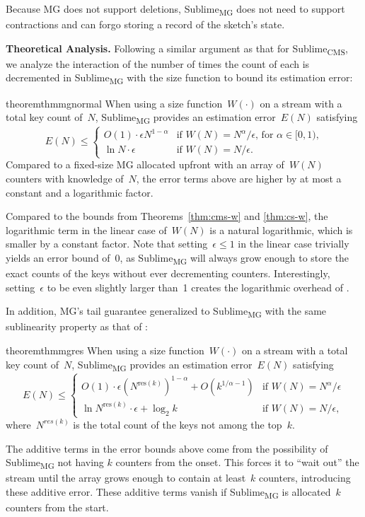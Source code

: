 \documentclass[sigconf]{acmart}
\newcommand{\sketch}{Sublime}
\newcommand{\sketchcms}{\sketch\textsubscript{CMS}\xspace}
\newcommand{\sketchmg}{\sketch\textsubscript{MG}\xspace}
\newcommand{\parentheses}[1]{\left(#1\right)}
\begin{document}
Because MG does not support deletions, \sketchmg does not need to support
contractions and can forgo storing a record of the sketch's state.

\textbf{Theoretical Analysis.} 
Following a similar argument as that for \sketchcms, we analyze the interaction
of the number of times the count of each is decremented in \sketchmg with the
size function to bound its estimation error:
\begin{restatable}{theorem}{thmmgnormal}
    \label{thm:mg-normal}
    When using a size function~$W(\cdot)$ on a stream with a total key count
    of~$N$, \sketchmg provides an estimation error~$E(N)$ satisfying
    $$
    E(N) \leq  
    \begin{cases}
        O(1) \cdot \epsilon N^{1-\alpha} & \text{if $W(N)=N^{\alpha}/\epsilon$, for $\alpha \in [0,1)$,} \\
        \ln N \cdot \epsilon & \text{if $W(N)=N/\epsilon$.}
    \end{cases}
    $$
    Compared to a fixed-size MG allocated upfront with an array of~$W(N)$
    counters with knowledge of~$N$, the error terms above are higher by at most
    a constant and a logarithmic factor.
\end{restatable}
Compared to the bounds from Theorems~\ref{thm:cms-w} and \ref{thm:cs-w}, the
logarithmic term in the linear case of~$W(N)$ is a natural logarithmic, which
is smaller by a constant factor. Note that setting~$\epsilon \leq 1$ in the
linear case trivially yields an error bound of~0, as \sketchmg will always grow
enough to store the exact counts of the keys without ever decrementing
counters. Interestingly, setting~$\epsilon$ to be even slightly larger than~1
creates the logarithmic overhead of .

In addition, MG's tail guarantee generalized to \sketchmg with the same
sublinearity property as that of :
\begin{restatable}{theorem}{thmmgres}
    \label{thm:mg-res}
    When using a size function~$W(\cdot)$ on a stream with a total key count
    of~$N$, \sketchmg provides an estimation error~$E(N)$ satisfying
    $$
    E(N) \leq  
    \begin{cases}
        O(1) \cdot \epsilon \parentheses{N^{\text{res}(k)}}^{1-\alpha} + O(k^{1/\alpha-1}) & \text{if $W(N)=N^{\alpha}/\epsilon$} \\
        \ln N^{\text{res}(k)} \cdot \epsilon + \log_2 k  & \text{if $W(N)=N/\epsilon$,}
    \end{cases}
    $$
    where~$N^{res(k)}$ is the total count of the keys not among the top~$k$.
\end{restatable}
The additive terms in the error bounds above come from the possibility of
\sketchmg not having $k$ counters from the onset. This forces it to ``wait
out'' the stream until the array grows enough to contain at least~$k$ counters,
introducing these additive error. These additive terms vanish if \sketchmg is
allocated~$k$ counters from the start.
\end{document}
